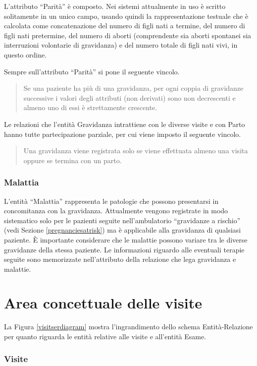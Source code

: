 L'attributo \enquote{Parità} è composto.
Nei sistemi attualmente in uso è scritto solitamente in un unico campo, usando quindi la rappresentazione testuale che è calcolata come concatenazione del numero di figli nati a termine, del numero di figli nati pretermine, del numero di aborti (comprendente sia aborti spontanei sia interruzioni volontarie di gravidanza) e del numero totale di figli nati vivi, in questo ordine.

Sempre sull'attributo \enquote{Parità} si pone il seguente vincolo.
\begin{quote}
Se una paziente ha più di una gravidanza, per ogni coppia di gravidanze successive i valori degli attributi (non derivati) sono non decrescenti e almeno uno di essi è strettamente crescente.
\end{quote}

Le relazioni che l'entità Gravidanza intrattiene con le diverse visite e con Parto hanno tutte partecipazione parziale, per cui viene imposto il seguente vincolo.
\begin{quote}
Una gravidanza viene registrata solo se viene effettuata almeno una visita oppure se termina con un parto.
\end{quote}

\subsubsection{Malattia}

L'entità \enquote{Malattia} rappresenta le patologie che possono presentarsi in concomitanza con la gravidanza.
Attualmente vengono registrate in modo sistematico solo per le pazienti seguite nell'ambulatorio \enquote{gravidanze a rischio} (vedi Sezione \ref{pregnanciesatrisk}) ma è applicabile alla gravidanza di qualsiasi paziente.
È importante considerare che le malattie possono variare tra le diverse gravidanze della stessa paziente.
Le informazioni riguardo alle eventuali terapie seguite sono memorizzate nell'attributo della relazione che lega gravidanza e malattie.

\section{Area concettuale delle visite}
\label{visitsconceptual}

La Figura \ref{visitserdiagram} mostra l'ingrandimento dello schema Entità-Relazione per quanto riguarda le entità relative alle visite e all'entità Esame.

\subsubsection{Visite}

